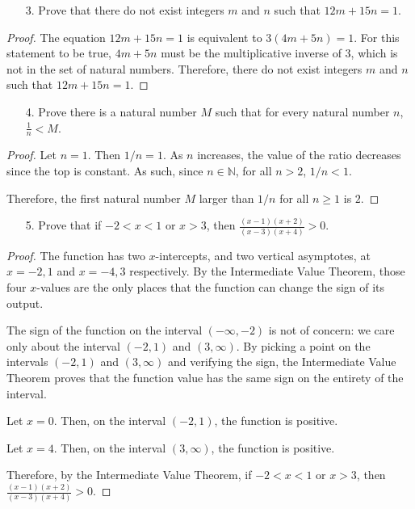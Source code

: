 \documentclass[10pt]{article}
\theoremstyle{definition}
\theoremstyle{plain}
\newcommand{\N}{\mathbb{N}}
\begin{document}
\begin{enumerate}
\item[3.] Prove that there do not exist integers $m$ and $n$ such that $12m + 15n = 1$.
\end{enumerate}

\begin{proof}
  The equation $12m + 15n = 1$ is equivalent to $3(4m+5n)=1$. For this statement to be true, $4m+5n$ must be the multiplicative inverse of $3$, which is not in the set of natural numbers. Therefore, there do not exist integers $m$ and $n$ such that $12m + 15n = 1$.
\end{proof}

\begin{enumerate}
\item[4.] Prove there is a natural number $M$ such that for every natural number $n$, $\frac{1}{n} < M$.
\end{enumerate}

\begin{proof}
  Let $n=1$. Then $1/n=1$. As $n$ increases, the value of the ratio decreases since the top is constant. As such, since $n\in\N$, for all $n>2$, $1/n < 1$.
  \\
  \par Therefore, the first natural number $M$ larger than $1/n$ for all $n\geq 1$ is $2$.
\end{proof}

\begin{enumerate}
\item[5.] Prove that if $-2 < x < 1$ or $x > 3$, then $\frac{(x-1)(x+2)}{(x-3)(x+4)} > 0$.
\end{enumerate}

\begin{proof}
  The function has two $x$-intercepts, and two vertical asymptotes, at $x=-2,1$ and $x=-4,3$ respectively. By the Intermediate Value Theorem, those four $x$-values are the only places that the function can change the sign of its output.
  \\
  \par The sign of the function on the interval $(-\infty, -2)$ is not of concern: we care only about the interval $(-2,1)$ and $(3,\infty)$. By picking a point on the intervals $(-2,1)$ and $(3,\infty)$ and verifying the sign, the Intermediate Value Theorem proves that the function value has the same sign on the entirety of the interval.
  \\
  \par Let $x=0$. Then, on the interval $(-2,1)$, the function is positive.
  \\
  \par Let $x=4$. Then, on the interval $(3,\infty)$, the function is positive.
  \\
  \par Therefore, by the Intermediate Value Theorem, if $-2 < x < 1$ or $x > 3$, then $\frac{(x-1)(x+2)}{(x-3)(x+4)} > 0$.
\end{proof}
\end{document}
